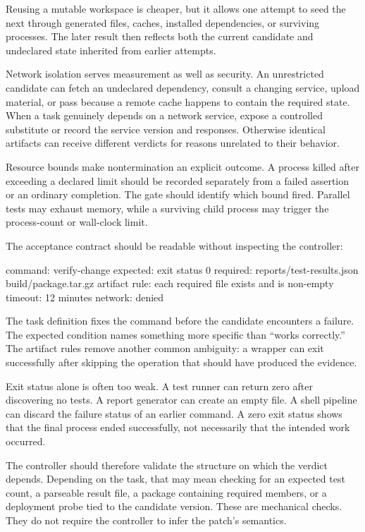 Reusing a mutable workspace is cheaper, but it allows one attempt to seed the next through generated files, caches, installed dependencies, or surviving processes. The later result then reflects both the current candidate and undeclared state inherited from earlier attempts.

Network isolation serves measurement as well as security. An unrestricted candidate can fetch an undeclared dependency, consult a changing service, upload material, or pass because a remote cache happens to contain the required state. When a task genuinely depends on a network service, expose a controlled substitute or record the service version and responses. Otherwise identical artifacts can receive different verdicts for reasons unrelated to their behavior.

Resource bounds make nontermination an explicit outcome. A process killed after exceeding a declared limit should be recorded separately from a failed assertion or an ordinary completion. The gate should identify which bound fired. Parallel tests may exhaust memory, while a surviving child process may trigger the process-count or wall-clock limit.

The acceptance contract should be readable without inspecting the controller:

\begin{record}
\begin{recordbody}
command:       verify-change
expected:      exit status 0
required:      reports/test-results.json
               build/package.tar.gz
artifact rule: each required file exists and is non-empty
timeout:       12 minutes
network:       denied
\end{recordbody}
\end{record}

The task definition fixes the command before the candidate encounters a failure. The expected condition names something more specific than ``works correctly.'' The artifact rules remove another common ambiguity: a wrapper can exit successfully after skipping the operation that should have produced the evidence.

Exit status alone is often too weak. A test runner can return zero after discovering no tests. A report generator can create an empty file. A shell pipeline can discard the failure status of an earlier command. A zero exit status shows that the final process ended successfully, not necessarily that the intended work occurred.

The controller should therefore validate the structure on which the verdict depends. Depending on the task, that may mean checking for an expected test count, a parseable result file, a package containing required members, or a deployment probe tied to the candidate version. These are mechanical checks. They do not require the controller to infer the patch's semantics.

